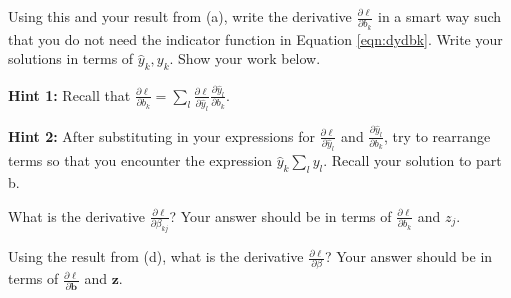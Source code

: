 \documentclass[11pt,addpoints,answers]{exam}
\newcommand{\bv}{\mathbf{b}}
\newcommand{\zv}{\mathbf{z}}
\newcommand{\betav      }{\boldsymbol \beta      }
\begin{document}
\begin{questions}
\begin{parts}
\begin{subparts}
    Using this and your result from (a), write the derivative $\frac{\partial \ell}{\partial b_k}$ in a smart way such that you do not need the indicator function in Equation \ref{eqn:dydbk}. Write your solutions in terms of $\hat{y}_k,y_k$. Show your work below.
    
    \textbf{Hint 1:} Recall that $\frac{\partial \ell}{\partial b_k} = \sum_l \frac{\partial \ell}{\partial \hat{y}_l}\frac{\partial \hat{y}_l}{\partial b_k}$.
    
    \textbf{Hint 2:} After substituting in your expressions for $\frac{\partial \ell}{\partial \hat{y}_l}$ and $\frac{\partial \hat{y}_l}{\partial b_k}$, try to rearrange terms so that you encounter the expression $\hat{y}_k \sum_l y_l$. Recall your solution to part b.
    
    \begin{your_solution}[title=$\partial \ell / \partial b_k$,height=11cm,width=15cm]
    \end{your_solution}
    
    \clearpage
    \subpart[1] What is the derivative \(\frac{\partial \ell}{\partial \beta_{kj}}\)? Your answer should be in terms of \(\frac{\partial \ell}{\partial b_k}\) and \(z_j\).

    \begin{your_solution}[title=\(\partial \ell/\partial \beta_{kj}\),height=4cm,width=15cm]
    \end{your_solution}

    \subpart[1] Using the result from (d), what is the derivative \(\frac{\partial \ell}{\partial \beta}\)? Your answer should be in terms of \(\frac{\partial \ell}{\partial \mathbf{b}}\) and \(\mathbf{z}\).

    \begin{your_solution}[title=\(\partial \ell/\partial \beta\),height=3cm,width=15cm]
    \end{your_solution}


    
    


\end{subparts}
\end{parts}
\end{questions}
\end{document}
